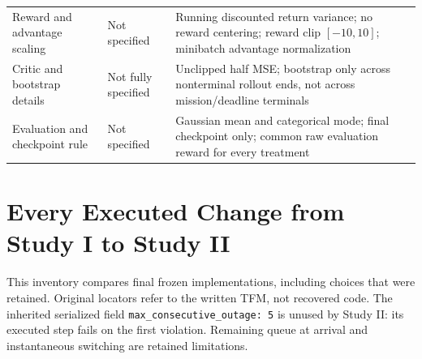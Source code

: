 {\begin{tabular}{@{}p{}p{}p{}@{}}
Reward and advantage scaling & Not specified & Running discounted return variance; no reward centering;
reward clip $[-10,10]$; minibatch advantage normalization \\
Critic and bootstrap details & Not fully specified & Unclipped half MSE; bootstrap only across nonterminal
rollout ends, not across mission/deadline terminals \\
Evaluation and checkpoint rule & Not specified & Gaussian mean and categorical mode; final checkpoint only;
common raw evaluation reward for every treatment \\
\bottomrule
\end{tabular}
\vspace{1.5em}
}

\bigskip
\section{Every Executed Change from Study I to Study II}
\label{app:v2changes}
This inventory compares final frozen implementations, including choices that
were retained. Original locators refer to the written TFM, not recovered code.
The inherited serialized field \texttt{max\_consecutive\_outage: 5} is unused by
Study II: its executed step fails on the first violation. Remaining queue at
arrival and instantaneous switching are retained limitations.

